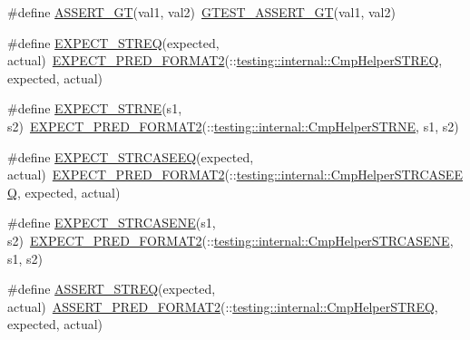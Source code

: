 \begin{DoxyCompactItemize}
\item 
\#define \hyperlink{fused-src_2gtest_2gtest_8h_a16a882d4eafc9f8643867aea40879140}{A\-S\-S\-E\-R\-T\-\_\-\-G\-T}(val1, val2)~\hyperlink{include_2gtest_2gtest_8h_a088b9056fd1c1f316b41c22f64deb33a}{G\-T\-E\-S\-T\-\_\-\-A\-S\-S\-E\-R\-T\-\_\-\-G\-T}(val1, val2)
\item 
\#define \hyperlink{fused-src_2gtest_2gtest_8h_a5b4b193a92c39b99d7b9404c49feef0b}{E\-X\-P\-E\-C\-T\-\_\-\-S\-T\-R\-E\-Q}(expected, actual)~\hyperlink{gtest__pred__impl_8h_af0141918615a5e2d5247e9cda8324dae}{E\-X\-P\-E\-C\-T\-\_\-\-P\-R\-E\-D\-\_\-\-F\-O\-R\-M\-A\-T2}(\-::\hyperlink{namespacetesting_1_1internal_a11ff4bc46dddd8bb07c0e247a603695d}{testing\-::internal\-::\-Cmp\-Helper\-S\-T\-R\-E\-Q}, expected, actual)
\item 
\#define \hyperlink{fused-src_2gtest_2gtest_8h_aee7e9c42f55549dbc0dfc42391eb9775}{E\-X\-P\-E\-C\-T\-\_\-\-S\-T\-R\-N\-E}(s1, s2)~\hyperlink{gtest__pred__impl_8h_af0141918615a5e2d5247e9cda8324dae}{E\-X\-P\-E\-C\-T\-\_\-\-P\-R\-E\-D\-\_\-\-F\-O\-R\-M\-A\-T2}(\-::\hyperlink{namespacetesting_1_1internal_af2d31c77ce73e1003a64bd7ca3564bbe}{testing\-::internal\-::\-Cmp\-Helper\-S\-T\-R\-N\-E}, s1, s2)
\item 
\#define \hyperlink{fused-src_2gtest_2gtest_8h_acd0cb7ae81a768e9cc639804a478e71c}{E\-X\-P\-E\-C\-T\-\_\-\-S\-T\-R\-C\-A\-S\-E\-E\-Q}(expected, actual)~\hyperlink{gtest__pred__impl_8h_af0141918615a5e2d5247e9cda8324dae}{E\-X\-P\-E\-C\-T\-\_\-\-P\-R\-E\-D\-\_\-\-F\-O\-R\-M\-A\-T2}(\-::\hyperlink{namespacetesting_1_1internal_a802d9586d870a90e6a850953c167654d}{testing\-::internal\-::\-Cmp\-Helper\-S\-T\-R\-C\-A\-S\-E\-E\-Q}, expected, actual)
\item 
\#define \hyperlink{fused-src_2gtest_2gtest_8h_a07d0b5cbd3b5f7c8b6f44c609046ff07}{E\-X\-P\-E\-C\-T\-\_\-\-S\-T\-R\-C\-A\-S\-E\-N\-E}(s1, s2)~\hyperlink{gtest__pred__impl_8h_af0141918615a5e2d5247e9cda8324dae}{E\-X\-P\-E\-C\-T\-\_\-\-P\-R\-E\-D\-\_\-\-F\-O\-R\-M\-A\-T2}(\-::\hyperlink{namespacetesting_1_1internal_a7e31d489f06ab8f6a81a7729f0c377e7}{testing\-::internal\-::\-Cmp\-Helper\-S\-T\-R\-C\-A\-S\-E\-N\-E}, s1, s2)
\item 
\#define \hyperlink{fused-src_2gtest_2gtest_8h_a54e8edaad096ff704fedaa65a3e24f78}{A\-S\-S\-E\-R\-T\-\_\-\-S\-T\-R\-E\-Q}(expected, actual)~\hyperlink{gtest__pred__impl_8h_ac452685a1a98ea3d96eb956a062ee210}{A\-S\-S\-E\-R\-T\-\_\-\-P\-R\-E\-D\-\_\-\-F\-O\-R\-M\-A\-T2}(\-::\hyperlink{namespacetesting_1_1internal_a11ff4bc46dddd8bb07c0e247a603695d}{testing\-::internal\-::\-Cmp\-Helper\-S\-T\-R\-E\-Q}, expected, actual)

\end{DoxyCompactItemize}
